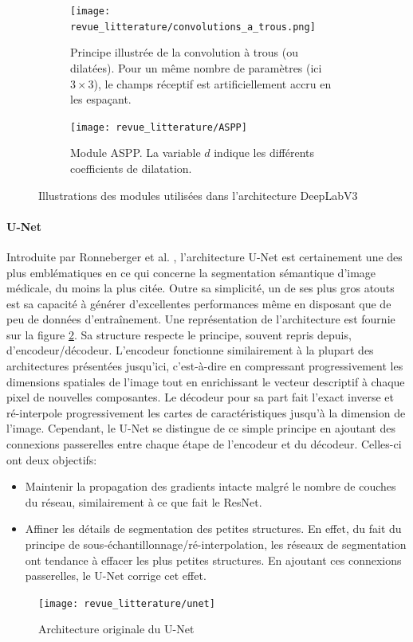 \begin{figure}[!h]
	\centering
	\begin{subfigure}[t]{0.48\textwidth}
	\texttt{[image: revue\_litterature/convolutions\_a\_trous.png]}
	\caption{Principe illustrée de la convolution à trous (ou dilatées). Pour un même nombre de paramètres (ici $3 \times 3$), le champs réceptif est artificiellement accru en les espaçant.}
	\end{subfigure}
	\hfill
	\begin{subfigure}[!ht]{0.45\textwidth}
		\texttt{[image: revue\_litterature/ASPP]}
		\caption{Module ASPP. La variable $d$ indique les différents coefficients de dilatation.}
	\end{subfigure}

	\caption{Illustrations des modules utilisées dans l'architecture DeepLabV3\cite{chenRethinkingAtrousConvolution2017}}
	\label{fig:aTrousConvolutions}
\end{figure}

\paragraph{U-Net}
\label{par:Unet}

Introduite par Ronneberger et al. \cite{ronnebergerUNetConvolutionalNetworks2015b}, l'architecture U-Net est certainement une des plus emblématiques en ce qui concerne la segmentation sémantique d'image médicale, du moins la plus citée. Outre sa simplicité, un de ses plus gros atouts est sa capacité à générer d'excellentes performances même en disposant que de peu de données d'entraînement. Une représentation de l'architecture est fournie sur la figure \ref{fig:UnetArchitecture}. Sa structure respecte le principe, souvent repris depuis, d'encodeur/décodeur. L'encodeur fonctionne similairement à la plupart des architectures présentées jusqu'ici, c'est-à-dire en compressant progressivement les dimensions spatiales de l'image tout en enrichissant le vecteur descriptif à chaque pixel de nouvelles composantes. Le décodeur pour sa part fait l'exact inverse et ré-interpole progressivement les cartes de caractéristiques jusqu'à la dimension de l'image. Cependant, le U-Net se distingue de ce simple principe en ajoutant des connexions passerelles entre chaque étape de l'encodeur et du décodeur. Celles-ci ont deux objectifs:
\begin{itemize}
	\item Maintenir la propagation des gradients intacte malgré le nombre de couches du réseau, similairement à ce que fait le ResNet.
	\item Affiner les détails de segmentation des petites structures. En effet, du fait du principe de sous-échantillonnage/ré-interpolation, les réseaux de segmentation ont tendance à effacer les plus petites structures. En ajoutant ces connexions passerelles, le U-Net corrige cet effet.
\end{itemize}
\begin{figure}[!htb]
	\centering
	\texttt{[image: revue\_litterature/unet]}
	\caption{Architecture originale du U-Net}
	\label{fig:UnetArchitecture}
\end{figure}
